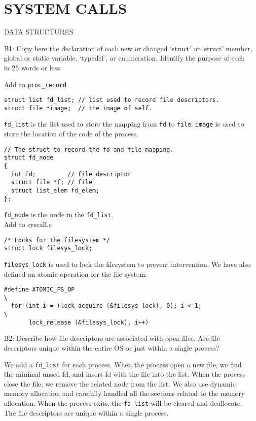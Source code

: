 \section{SYSTEM CALLS}
\begin{aspect}{DATA STRUCTURES}
	\begin{qc}
		B1: Copy here the declaration of each new or changed
		`struct' or `struct' member, global or static variable, `typedef', or enumeration.
		Identify the purpose of each in 25 words or less.
	\end{qc}
	Add to \lstinline{proc_record}
	\begin{lstlisting}
struct list fd_list; // list used to record file descriptors.
struct file *image;  // the image of self.
	\end{lstlisting}
	\lstinline{fd_list} is the list used to store the mapping from \lstinline{fd} to \lstinline{file}. \lstinline{image} is used to store the location of the code of the process.
	\begin{lstlisting}
// The struct to record the fd and file mapping.
struct fd_node
{
  int fd;         // file descriptor
  struct file *f; // file
  struct list_elem fd_elem;
};
	\end{lstlisting}
\lstinline{fd_node} is the node in the \lstinline{fd_list}.\\
Add to syscall.c
\begin{lstlisting}
/* Locks for the filesystem */
struct lock filesys_lock;
\end{lstlisting}	
\lstinline{filesys_lock} is used to lock the filesystem to prevent intervention. We have also defined an atomic operation for the file system. 
\begin{lstlisting}
#define ATOMIC_FS_OP                                                          \
  for (int i = (lock_acquire (&filesys_lock), 0); i < 1;                      \
       lock_release (&filesys_lock), i++)
\end{lstlisting}
	\begin{qc}
		B2: Describe how file descriptors are associated with open files.
		Are file descriptors unique within the entire OS or just within a single process?
	\end{qc}
	We add a \lstinline{fd_list} for each process. When the process open a new file, we find the minimal unsed fd, and insert fd with the file into the list. When the process close the file, we remove the related node from the list. We also use dynamic memory allocation and carefully handled all the sections related to the memory allocation. When the process exits, the \lstinline{fd_list} will be cleared and deallocate.\\
	The file descriptors are unique within a single process.
\end{aspect}

